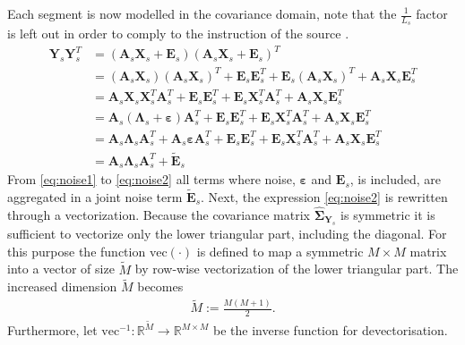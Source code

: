 Each segment is now modelled in the covariance domain, note that the $\frac{1}{L_s}$ factor is left out in order to comply to the instruction of the source \cite{Balkan2015}.
\begin{align} 
\mathbf{Y}_s \mathbf{Y}_s^T &=  \left( \mathbf{A}_s \mathbf{X}_s + \mathbf{E}_s \right) \left( \mathbf{A}_s \mathbf{X}_s + \mathbf{E}_s\right)^T \nonumber \\ 
 &=  (\textbf{A}_s\textbf{X}_s)(\textbf{A}_s\textbf{X}_s)^T + \textbf{E}_s \textbf{E}_s^T + \textbf{E}_s (\textbf{A}_s\textbf{X}_s)^T + \textbf{A}_s\textbf{X}_s \textbf{E}_s^T  \nonumber \\
&= \textbf{A}_s\textbf{X}_s \textbf{X}_s^T \textbf{A}_s^T + \textbf{E}_s \textbf{E}_s^T + \textbf{E}_s \textbf{X}_s^T \textbf{A}_s^T + \textbf{A}_s\textbf{X}_s \textbf{E}_s^T  \nonumber \\
&= \textbf{A}_s(\boldsymbol{\Lambda}_s +\boldsymbol{\varepsilon}) \textbf{A}_s^T + \textbf{E}_s \textbf{E}_s^T + \textbf{E}_s \textbf{X}_s^T \textbf{A}_s^T + \textbf{A}_s\textbf{X}_s \textbf{E}_s^T \nonumber \\
&= \textbf{A}_s \boldsymbol{\Lambda}_s \textbf{A}_s^T + \textbf{A}_s \boldsymbol{\varepsilon} \textbf{A}_s^T + \textbf{E}_s \textbf{E}_s^T + \textbf{E}_s \textbf{X}_s^T \textbf{A}_s^T + \textbf{A}_s\textbf{X}_s \textbf{E}_s^T \label{eq:noise1} \\
&= \textbf{A}_s \boldsymbol{\Lambda}_s \textbf{A}_s^T + \widetilde{\textbf{E}}_s \label{eq:noise2}
\end{align}
From \eqref{eq:noise1} to \eqref{eq:noise2} all terms where noise, $\boldsymbol{\varepsilon}$ and $\mathbf{E}_s$, is included, are aggregated in a joint noise term $\widetilde{\textbf{E}}_s$. 
Next, the expression \eqref{eq:noise2} is rewritten through a vectorization. 
Because the covariance matrix $\widehat{\boldsymbol{\Sigma}}_{\mathbf{Y}_s}$ is symmetric it is sufficient to vectorize only the lower triangular part, including the diagonal. 
For this purpose the function $\text{vec}(\cdot)$ is defined to map a symmetric $M \times M$ matrix into a vector of size $\widetilde{M}$ by row-wise vectorization of the lower triangular part. The increased dimension $\widetilde{M}$ becomes 
\begin{align}
\widetilde{M} := \frac{M(M+1)}{2}.
\end{align}
Furthermore, let $\text{vec}^{-1}: \mathbb{R}^{\widetilde{M}} \rightarrow \mathbb{R}^{M\times M}$ be the inverse function for devectorisation. 


